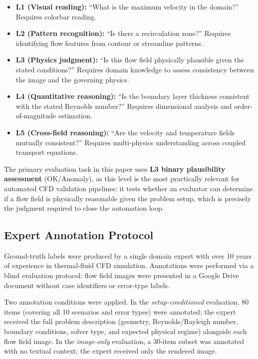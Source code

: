 \documentclass[preprint,12pt]{elsarticle}
\begin{document}
\begin{itemize}
  \item \textbf{L1 (Visual reading):} ``What is the maximum velocity in the
    domain?'' Requires colorbar reading.
  \item \textbf{L2 (Pattern recognition):} ``Is there a recirculation
    zone?'' Requires identifying flow features from contour or streamline
    patterns.
  \item \textbf{L3 (Physics judgment):} ``Is this flow field physically
    plausible given the stated conditions?'' Requires domain knowledge to
    assess consistency between the image and the governing physics.
  \item \textbf{L4 (Quantitative reasoning):} ``Is the boundary layer thickness
    consistent with the stated Reynolds number?'' Requires dimensional analysis
    and order-of-magnitude estimation.
  \item \textbf{L5 (Cross-field reasoning):} ``Are the velocity and temperature
    fields mutually consistent?'' Requires multi-physics understanding across
    coupled transport equations.
\end{itemize}

The primary evaluation task in this paper uses \textbf{L3 binary plausibility
assessment} (OK/Anomaly), as this level is the most practically relevant for
automated CFD validation pipelines: it tests whether an evaluator can determine
if a flow field is physically reasonable given the problem setup, which is
precisely the judgment required to close the automation loop.

\subsection{Expert Annotation Protocol}
\label{sec:expert-annotation}

Ground-truth labels were produced by a single domain expert with over 10 years
of experience in thermal-fluid CFD simulation. Annotations were performed via a
blind evaluation protocol: flow field images were presented in a Google Drive
document without case identifiers or error-type labels.

Two annotation conditions were applied. In the \emph{setup-conditioned}
evaluation, 80 items (covering all 10 scenarios and error types) were annotated;
the expert received the full problem description (geometry, Reynolds/Rayleigh
number, boundary conditions, solver type, and expected physical regime) alongside
each flow field image. In the \emph{image-only} evaluation, a 30-item subset was
annotated with no textual context; the expert received only the rendered image.
\end{document}
